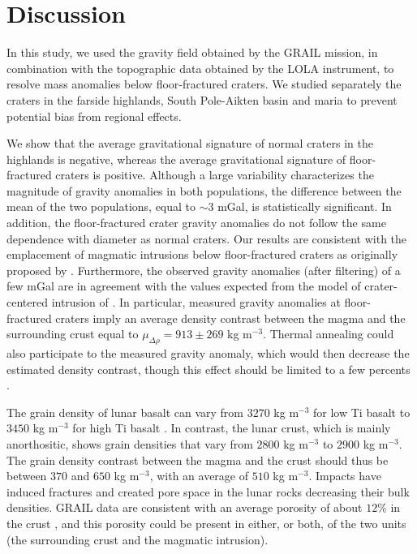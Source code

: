\section{Discussion}
\label{sec:discussion}

In  this study,  we  used  the gravity  field  obtained  by the  GRAIL
mission, in combination with the topographic data obtained by the LOLA
instrument, to  resolve mass anomalies below  floor-fractured craters.
We  studied separately  the craters  in the  farside highlands,  South
Pole-Aikten basin  and maria to  prevent potential bias  from regional
effects.

We show that the average  gravitational signature of normal craters in
the highlands is negative, whereas the average gravitational signature
of floor-fractured craters is  positive.  Although a large variability
characterizes the magnitude of  gravity anomalies in both populations,
the  difference between  the mean  of  the two  populations, equal  to
$\sim  3$  mGal,  is  statistically  significant.   In  addition,  the
floor-fractured  crater  gravity  anomalies  do not  follow  the  same
dependence  with   diameter  as  normal  craters.    Our  results  are
consistent  with   the  emplacement   of  magmatic   intrusions  below
floor-fractured     craters     as      originally     proposed     by
\citet{Schultz:1976kt}.  Furthermore,  the observed  gravity anomalies
(after  filtering) of  a few  mGal are  in agreement  with the  values
expected   from   the   model    of   crater-centered   intrusion   of
\citet{Thorey:2014cv}.  In  particular, measured gravity  anomalies at
floor-fractured craters imply an  average density contrast between the
magma      and      the      surrounding      crust      equal      to
$\mu_{\Delta \rho} = 913 \pm 269$ kg m$^{-3}$. Thermal annealing could
also participate  to the  measured gravity  anomaly, which  would then
decrease the estimated density contrast,  though this effect should be
limited to a few percents \citep{Michaut:2011dt,Kiefer:2013hr}.

The grain density of lunar basalt can vary from $3270$ kg m$^{-3}$ for
low   Ti  basalt   to  $3450$   kg   m$^{-3}$  for   high  Ti   basalt
\citep{Kiefer:2012kp}.  In contrast, the  lunar crust, which is mainly
anorthositic, shows grain densities that  vary from $2800$ kg m$^{-3}$
to $ 2900$  kg m$^{-3}$. The grain density contrast  between the magma
and the crust should thus be between $370$ and $650$ kg m$^{-3}$, with
an average  of $510$ kg  m$^{-3}$. Impacts have induced  fractures and
created pore space in the lunar rocks decreasing their bulk densities.
GRAIL data are consistent with an  average porosity of about $12\%$ in
the  crust  \citep{Wieczorek:2013ipa},  and  this  porosity  could  be
present in  either, or both, of  the two units (the  surrounding crust
and the magmatic intrusion).

